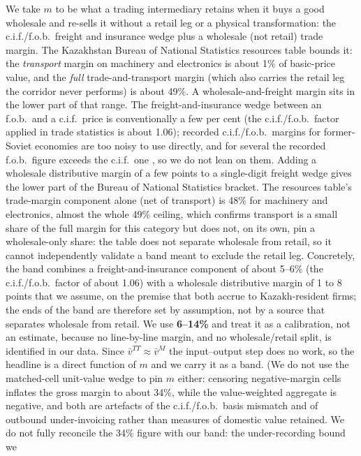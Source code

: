 \documentclass[12pt]{article}
\begin{document}
We take $m$ to be what a trading intermediary retains when it buys a good wholesale and
re-sells it without a retail leg or a physical transformation: the c.i.f./f.o.b.\ freight and
insurance wedge plus a wholesale (not retail) trade margin. The Kazakhstan Bureau of National
Statistics resources table \citep{qazstat2023io} bounds it: the \emph{transport} margin on
machinery and electronics is about 1\% of basic-price value, and the \emph{full}
trade-and-transport margin (which also carries the retail leg the corridor never performs) is
about 49\%. A wholesale-and-freight margin sits in the lower part of that range. The
freight-and-insurance wedge between an f.o.b.\ and a c.i.f.\ price is conventionally a few per
cent (the c.i.f./f.o.b.\ factor applied in trade statistics is about 1.06); recorded
c.i.f./f.o.b.\ margins for former-Soviet economies are too noisy to use directly, and for
several the recorded f.o.b.\ figure exceeds the c.i.f.\ one \citep{arvis2010landlocked}, so we
do not lean on them. Adding a wholesale distributive margin of a few points to a single-digit
freight wedge gives the lower part of the Bureau of National Statistics bracket. The resources
table's trade-margin component alone (net of transport) is 48\% for machinery and electronics,
almost the whole 49\% ceiling, which confirms transport is a small share of the full margin for
this category but does not, on its own, pin a wholesale-only share: the table does not separate
wholesale from retail, so it cannot independently validate a band meant to exclude the retail
leg. Concretely, the band combines a freight-and-insurance component of about 5--6\% (the c.i.f./f.o.b.\ factor of about 1.06) with a wholesale distributive margin of 1 to 8 points that we assume, on the premise that both accrue to Kazakh-resident firms; the ends of the band are therefore set by assumption, not by a source that separates wholesale from retail. We use \textbf{6--14\%} and treat it as a calibration, not an estimate, because no
line-by-line margin, and no wholesale/retail split, is identified in our data. Since
$\bar v^{TT} \approx \bar v^{M}$ the input--output
step does no work, so the headline is a direct function of $m$ and we carry it as a band. (We
do not use the matched-cell unit-value wedge to pin $m$ either: censoring negative-margin cells
inflates the gross margin to about 34\%,
while the value-weighted aggregate is negative, and both are artefacts of the c.i.f./f.o.b.\
basis mismatch and of outbound under-invoicing rather than measures of domestic value
retained. We do not fully reconcile the 34\% figure with our band: the under-recording bound we
\end{document}
